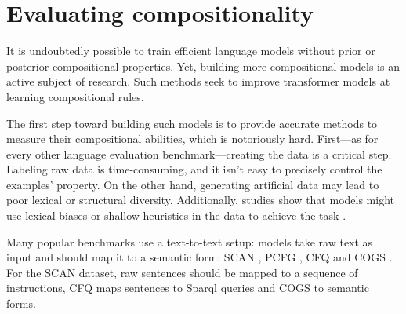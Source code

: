 \section{Evaluating compositionality}

It is undoubtedly possible to train efficient language models without prior or posterior compositional properties. Yet, building more compositional models is an active subject of research. Such methods seek to improve transformer models at learning compositional rules.

The first step toward building such models is to provide accurate methods to measure their compositional abilities, which is notoriously hard. First—as for every other language evaluation benchmark—creating the data is a critical step. Labeling raw data is time-consuming, and it isn't easy to precisely control the examples' property. On the other hand, generating artificial data may lead to poor lexical or structural diversity. Additionally, studies show that models might use lexical biases or shallow heuristics in the data to achieve the task \parencite{linzen_18}. 

Many popular benchmarks use a text-to-text setup: models take raw text as input and should map it to a semantic form: SCAN \parencite{lake_18}, PCFG \parencite{hupkes_20}, CFQ \parencite{keysers_20} and COGS \parencite{kim_20}. For the SCAN dataset, raw sentences should be mapped to a sequence of instructions, CFQ maps sentences to Sparql queries and COGS to semantic forms.

